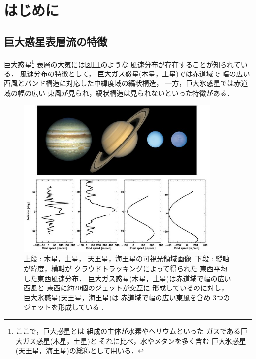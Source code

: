 \documentclass[a4j,12pt,openbib,oneside]{jreport}
\begin{document}
\chapter{はじめに}
\section{巨大惑星表層流の特徴}
\label{sec:intro1}
巨大惑星\footnote{ここで，巨大惑星とは
組成の主体が水素やヘリウムといった
ガスである巨大ガス惑星(木星，土星)と
それに比べ，水やメタンを多く含む
巨大氷惑星(天王星，海王星)の総称として用いる．}
表層の大気には図\ref{fig1}のような
風速分布が存在することが知られている\citep{showman2009atmospheric}．
風速分布の特徴として，
巨大ガス惑星(木星，土星)では赤道域で
幅の広い西風とバンド構造に対応した中緯度域の縞状構造，
一方，巨大氷惑星では赤道域の幅の広い
東風が見られ，縞状構造は見られないといった特徴がある．
%

\begin{figure}[b]
  \begin{center}
    \includegraphics[clip,width=10cm]{./fig/intro/fig1.jpg}
    \caption{
      \footnotesize{上段 : 木星，土星，
天王星，海王星の可視光領域画像.
下段 : 縦軸が緯度，横軸が
クラウドトラッキングによって得られた
東西平均した東西風速分布．
巨大ガス惑星(木星，土星)は赤道域で幅の広い西風と
東西に約20個のジェットが交互に
形成しているのに対し，
巨大氷惑星(天王星，海王星)は
赤道域で幅の広い東風を含め
3つのジェットを形成している
\citep{showman2009atmospheric}.
      }
    }
    \label{fig1}
  \end{center}
\end{figure}

\clearpage
\end{document}
